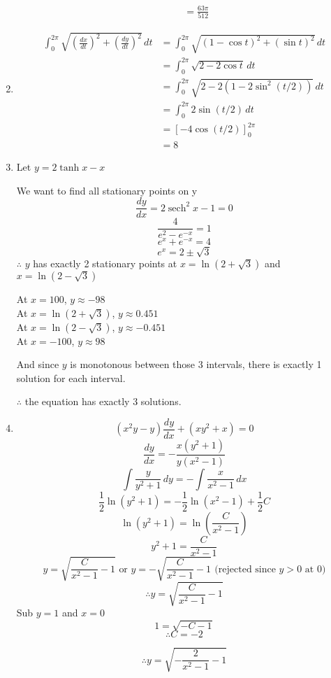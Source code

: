 \documentclass[12pt]{article}
\DeclareMathOperator{\sech}{sech}
\theoremstyle{definition}
\begin{document}
\begin{enumerate}
\begin{enumerate}
\begin{align*}
                            &= \frac{63\pi}{512}
                      \end{align*}
              \end{enumerate}
  \item \begin{align*}
          \int_0^{2\pi}\sqrt{\left(\frac{dx}{dt}\right)^2+\left(\frac{dy}{dt}\right)^2}\,dt &= \int_0^{2\pi}\sqrt{(1-\cos t)^2+(\sin t)^2}\,dt \\
            &= \int_0^{2\pi}\sqrt{2-2\cos t}\,dt \\
            &= \int_0^{2\pi}\sqrt{2-2(1-2\sin^2(t/2))}\,dt \\
            &= \int_0^{2\pi} 2\sin(t/2)\,dt \\
            &= [-4\cos(t/2)]_0^{2\pi} \\
            &= 8
        \end{align*}
  \item Let $y = 2\tanh x - x$
  
        We want to find all stationary points on y
        \[\frac{dy}{dx} = 2\sech ^2 x-1 = 0\]
        \[\frac{4}{e^2-e^{-x}}=1\]
        \[e^x+e^{-x}=4\]
        \[e^x = 2\pm \sqrt{3}\]
        $\therefore$ $y$ has exactly 2 stationary points at $x=\ln(2+\sqrt{3})$ and $x=\ln(2-\sqrt{3})$
        
        At $x=100$, $y\approx -98$ \\
        At $x=\ln(2+\sqrt{3})$, $y\approx 0.451$ \\
        At $x=\ln(2-\sqrt{3})$, $y\approx -0.451$ \\
        At $x=-100$, $y\approx 98$
        
        And since $y$ is monotonous between those 3 intervals, there is exactly 1 solution for each interval.
        
        $\therefore$ the equation has exactly 3 solutions.
  \item \[(x^2y-y)\frac{dy}{dx}+(xy^2+x)=0\]
        \[\frac{dy}{dx} = -\frac{x(y^2+1)}{y(x^2-1)}\]
        \[\int \frac{y}{y^2+1}\,dy = -\int \frac{x}{x^2-1}\,dx\]
        \[\frac{1}{2}\ln(y^2+1) = -\frac{1}{2}\ln(x^2-1) + \frac{1}{2}C\]
        \[\ln(y^2+1) = \ln\left(\frac{C}{x^2-1}\right)\]
        \[y^2+1 = \frac{C}{x^2-1}\]
        \[y = \sqrt{\frac{C}{x^2-1} - 1} \text{ or } y = -\sqrt{\frac{C}{x^2-1} - 1} \text{ (rejected since $y>0$ at 0)}\]
        \[\therefore y = \sqrt{\frac{C}{x^2-1} - 1}\]
        Sub $y=1$ and $x=0$
        \[1 = \sqrt{-C - 1}\]
        \[\therefore C=-2\]
        
        \[\therefore y = \sqrt{-\frac{2}{x^2-1} - 1}\]
        
\end{enumerate}
\end{document}
